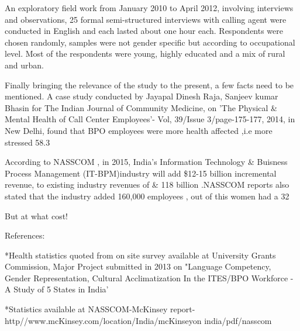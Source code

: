 An exploratory field work  from January 2010 to April 2012, involving interviews and observations, 25 formal semi-structured interviews with calling agent were conducted in English and each lasted about one hour each. Respondents were chosen randomly, samples were not gender specific but according to occupational level. Most of the respondents were young, highly educated and a mix of rural and urban.

Finally bringing the relevance of the study to the present, a few facts need to be mentioned. A case study conducted by Jayapal Dinesh Raja, Sanjeev kumar Bhasin for The Indian Journal of Community Medicine, on 'The Physical & Mental Health of Call Center Employees'- Vol, 39/Issue 3/page-175-177, 2014, in New Delhi, found that BPO employees were more health affected ,i.e more stressed 58.3%

According to NASSCOM , in 2015, India's Information Technology & Buisness Process Management (IT-BPM)industry will add \$12-15 billion incremental revenue, to existing industry revenues of & 118 billion .NASSCOM reports also stated that the industry added 160,000 employees , out of this women had a 32 %

But at what cost!

 References: 
 
 *Health statistics quoted from on site survey available at University Grants Commission, Major Project submitted in 2013 on "Language Competency, Gender Representation, Cultural Acclimatization In the ITES/BPO Workforce - A Study of 5 States in India'
 
 *Statistics available at NASSCOM-McKinsey report- http//www.mcKinsey.com/location/India/mcKinseyon india/pdf/nasscom
    
    
    